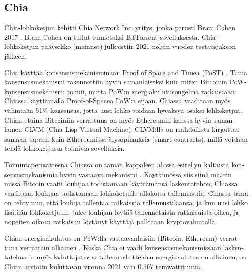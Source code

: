 \subsection{Chia\label{chia}}
\begin{otherlanguage}{english}

Chia-lohkoketjun kehitti Chia Network Inc. yritys, jonka perusti Bram Cohen 2017 \cite{chia1}. Bram Cohen on tullut tunnetuksi
BitTorrent-sovelluksesta. Chia-lohkoketjun pääverkko (mainnet) julkaistiin 2021 neljän vuoden testausjakson jälkeen.

Chia käyttää konsensusmekanisminaan Proof of Space and Timea (PoST) \cite{chia1}. Tämä konsensusmekanismi rakennettiin hyvin samanlaiseksi kuin miten Bitcoinin PoW-konsensusmekanismi toimii, mutta PoW:n energiakulutusongelma ratkaistaan Chiassa käyttämällä Proof-of-Spacea PoW:n sijaan. Chiassa vaaditaan myös vähintään 51\% konsensus, jotta uusi lohko voidaan hyväksyä osaksi lohkoketjua. Chian etuina Bitcoiniin verrattuna on myös Ethereumin kanssa hyvin samanlainen CLVM (Chia Lisp Virtual Machine). CLVM:llä on mahdollista kirjoittaa samaan tapaan kuin Ethereumissa älysopimuksia (smart contracts), millä voidaan tehdä lohkoketjussa toimivia sovelluksia.

Toimintaperiaatteena Chiassa on tämän kappaleen alussa esitellyn kaltaista konsensusmekanismia hyvin vastaava mekanismi \cite{pospchia1}. Käytännössä siis siinä määrin missä Bitcoin vaatii louhijaa todistamaan käyttämänsä laskentatehon, Chiassa vaaditaan louhijaa todistamaan lohkoketjulle allokoitu tallennustila. Chiassa tämä on tehty niin, että louhija tallentaa ratkaisuja tallennustilaansa, ja kun uusi lohko lisätään lohkoketjuun, tulee louhijan löytää tallennetuista ratkaisuista oikea, ja nopeiten oikean ratkaisun löytänyt käyttäjä palkitaan kryptovaluutalla.

Chian energiankulutus on PoW:lla vastaavanlaisiin (Bitcoin, Ethereum) verrattuna verrattain alhainen \cite{chiaenergy}. Koska Chia ei vaadi konsensusmekanismissaan laskentatehoa ja myös kuluttajatason tallennuslaitteiden energiakulutus on alhainen, on Chian arvioitu kuluttavan vuonna 2021 vain 0.307 terawattituntia.

\end{otherlanguage}